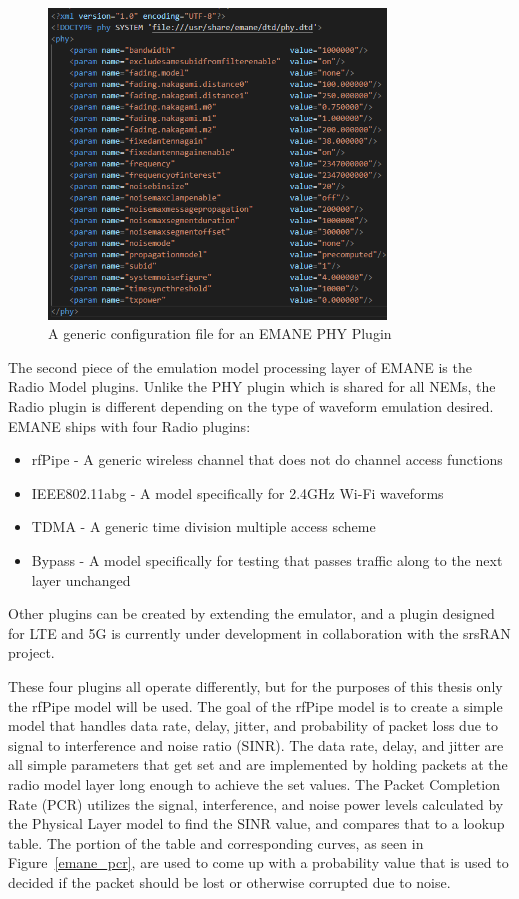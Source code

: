 \begin{figure}[!ht]
    \centering
    \includegraphics[width=0.8\textwidth,keepaspectratio]{Images/Chpt2/emane_phy.png}
    \caption{A generic configuration file for an EMANE PHY Plugin}
    \label{emane_phy}
\end{figure}

The second piece of the emulation model processing layer of EMANE is the Radio Model plugins.
Unlike the PHY plugin which is shared for all NEMs, the Radio plugin is different depending on the type of waveform emulation desired.
EMANE ships with four Radio plugins:
\begin{itemize}
    \item rfPipe - A generic wireless channel that does not do channel access functions
    \item IEEE802.11abg - A model specifically for 2.4GHz Wi-Fi waveforms
    \item TDMA - A generic time division multiple access scheme
    \item Bypass - A model specifically for testing that passes traffic along to the next layer unchanged
\end{itemize}
Other plugins can be created by extending the emulator, and a plugin designed for LTE and 5G is currently under development in collaboration with the srsRAN project. \par
These four plugins all operate differently, but for the purposes of this thesis only the rfPipe model will be used.
The goal of the rfPipe model is to create a simple model that handles data rate, delay, jitter, and probability of packet loss due to signal to interference and noise ratio (SINR).
The data rate, delay, and jitter are all simple parameters that get set and are implemented by holding packets at the radio model layer long enough to achieve the set values.
The Packet Completion Rate (PCR) utilizes the signal, interference, and noise power levels calculated by the Physical Layer model to find the SINR value, and compares that to a lookup table.
The portion of the table and corresponding curves, as seen in Figure~\ref{emane_pcr}, are used to come up with a probability value that is used to decided if the packet should be lost or otherwise corrupted due to noise.

